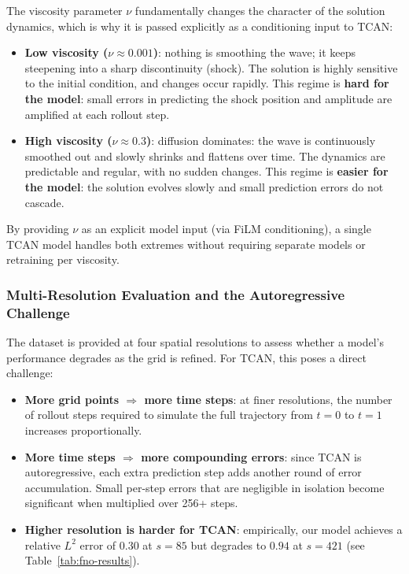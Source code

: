 The viscosity parameter $\nu$ fundamentally changes the character of the solution dynamics, which is why it is passed explicitly as a conditioning input to TCAN:

\begin{itemize}
  \item \textbf{Low viscosity ($\nu \approx 0.001$)}: nothing is smoothing the wave; it keeps steepening into a sharp discontinuity (shock). The solution is highly sensitive to the initial condition, and changes occur rapidly. This regime is \textbf{hard for the model}: small errors in predicting the shock position and amplitude are amplified at each rollout step.

  \item \textbf{High viscosity ($\nu \approx 0.3$)}: diffusion dominates: the wave is continuously smoothed out and slowly shrinks and flattens over time. The dynamics are predictable and regular, with no sudden changes. This regime is \textbf{easier for the model}: the solution evolves slowly and small prediction errors do not cascade.
\end{itemize}

By providing $\nu$ as an explicit model input (via FiLM conditioning), a single TCAN model handles both extremes without requiring separate models or retraining per viscosity.

\subsubsection{Multi-Resolution Evaluation and the Autoregressive Challenge}

The dataset is provided at four spatial resolutions to assess whether a model's performance degrades as the grid is refined. For TCAN, this poses a direct challenge:

\begin{itemize}
  \item \textbf{More grid points $\Rightarrow$ more time steps}: at finer resolutions, the number of rollout steps required to simulate the full trajectory from $t=0$ to $t=1$ increases proportionally.
  \item \textbf{More time steps $\Rightarrow$ more compounding errors}: since TCAN is autoregressive, each extra prediction step adds another round of error accumulation. Small per-step errors that are negligible in isolation become significant when multiplied over 256+ steps.
  \item \textbf{Higher resolution is harder for TCAN}: empirically, our model achieves a relative $L^2$ error of $0.30$ at $s=85$ but degrades to $0.94$ at $s=421$ (see Table~\ref{tab:fno-results}).
\end{itemize}

